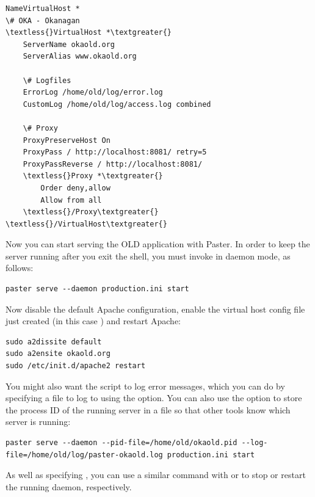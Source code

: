 \documentclass[letterpaper,10pt,english]{sphinxmanual}
\begin{document}
\begin{Verbatim}[commandchars=\\\{\}]
NameVirtualHost *
\# OKA - Okanagan
\textless{}VirtualHost *\textgreater{}
    ServerName okaold.org
    ServerAlias www.okaold.org

    \# Logfiles
    ErrorLog /home/old/log/error.log
    CustomLog /home/old/log/access.log combined

    \# Proxy
    ProxyPreserveHost On
    ProxyPass / http://localhost:8081/ retry=5
    ProxyPassReverse / http://localhost:8081/
    \textless{}Proxy *\textgreater{}
        Order deny,allow
        Allow from all
    \textless{}/Proxy\textgreater{}
\textless{}/VirtualHost\textgreater{}
\end{Verbatim}

Now you can start serving the OLD application with Paster.  In order to keep the
server running after you exit the shell, you must invoke  in
daemon mode, as follows:

\begin{Verbatim}[commandchars=\\\{\}]
paster serve --daemon production.ini start
\end{Verbatim}

Now disable the default Apache configuration, enable the virtual host config
file just created (in this case ) and restart Apache:

\begin{Verbatim}[commandchars=\\\{\}]
sudo a2dissite default
sudo a2ensite okaold.org
sudo /etc/init.d/apache2 restart
\end{Verbatim}

You might also want the  script to log error messages, which you
can do by specifying a file to log to using the  option.  You can
also use the  option to store the process ID of the running server
in a file so that other tools know which server is running:

\begin{Verbatim}[commandchars=\\\{\}]
paster serve --daemon --pid-file=/home/old/okaold.pid --log-file=/home/old/log/paster-okaold.log production.ini start
\end{Verbatim}

As well as specifying , you can use a similar command with  or
 to stop or restart the running daemon, respectively.
\end{document}
